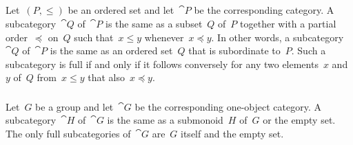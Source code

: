 \subsection{}



\subsubsection{}

Let~$(P, ≤)$ be an ordered set and let~$\cat{P}$ be the corresponding category.
A subcategory~$\cat{Q}$ of~$\cat{P}$ is the same as a subset~$Q$ of~$P$ together with a partial order~$\preceq$ on~$Q$ such that~$x ≤ y$ whenever~$x \preceq y$.
In other words, a subcategory~$\cat{Q}$ of~$\cat{P}$ is the same as an ordered set~$Q$ that is subordinate to~$P$.
Such a subcategory is full if and only if it follows conversely for any two elements~$x$ and~$y$ of~$Q$ from~$x ≤ y$ that also~$x \preceq y$.



\subsubsection{}

Let~$G$ be a group and let~$\cat{G}$ be the corresponding one-object category.
A subcategory~$\cat{H}$ of~$\cat{G}$ is the same as a submonoid~$H$ of~$G$ or the empty set.
The only full subcategories of~$\cat{G}$ are~$G$ itself and the empty set.
